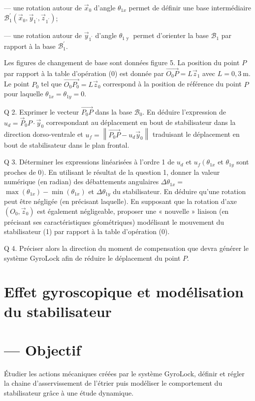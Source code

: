 — une rotation autour de $\vec{x}_{0}$ d'angle $\theta_{1 x}$ permet de définir une base intermédiaire $\mathcal{B}_{1}^{\prime}\left(\vec{x}_{0}, \vec{y}_{1^{\prime}}, \vec{z}_{1^{\prime}}\right)$;

— une rotation autour de $\vec{y}_{1^{\prime}}$ d'angle $\theta_{1 \text { y }}$ permet d'orienter la base $\mathcal{B}_{1}$ par rapport à la base $\mathcal{B}_{1}^{\prime}$.

Les figures de changement de base sont données figure 5. La position du point $P$ par rapport à la table d'opération (0) est donnée par $\overrightarrow{O_{0} P}=L \vec{z}_{1}$ avec $L=0,3 \mathrm{~m}$. Le point $P_{0}$ tel que $\overrightarrow{O_{0} P_{0}}=L \vec{z}_{0}$ correspond à la position de référence du point $P$ pour laquelle $\theta_{1 x}=\theta_{1 y}=0$.

Q 2. Exprimer le vecteur $\overrightarrow{P_{0} P}$ dans la base $\mathcal{B}_{0}$. En déduire l'expression de $u_{d}=\vec{P}_{0} P \cdot \vec{y}_{0}$ correspondant au déplacement en bout de stabilisateur dans la direction dorso-ventrale et $u_{f}=\left\|\overrightarrow{P_{0} P}-u_{d} \vec{y}_{0}\right\|$ traduisant le déplacement en bout de stabilisateur dans le plan frontal.

Q 3. Déterminer les expressions linéarisées à l'ordre 1 de $u_{d}$ et $u_{f}\left(\theta_{1 x}\right.$ et $\theta_{1 y}$ sont proches de 0$)$. En utilisant le résultat de la question 1, donner la valeur numérique (en radian) des débattements angulaires $\Delta \theta_{1 x}=$ $\max \left(\theta_{1 x}\right)-\min \left(\theta_{1 x}\right)$ et $\Delta \theta_{1 y}$ du stabilisateur. En déduire qu'une rotation peut être négligée (en précisant laquelle). En supposant que la rotation d'axe $\left(O_{0}, \vec{z}_{0}\right)$ est également négligeable, proposer une « nouvelle » liaison (en précisant ses caractéristiques géométriques) modélisant le mouvement du stabilisateur (1) par rapport à la table d'opération (0).

Q 4. Préciser alors la direction du moment de compensation que devra générer le système GyroLock afin de réduire le déplacement du point $P$.

\section{Effet gyroscopique et modélisation du stabilisateur}
\section{— Objectif}
Étudier les actions mécaniques créées par le système GyroLock, définir et régler la chaine d'asservissement de l'étrier puis modéliser le comportement du stabilisateur grâce à une étude dynamique.

